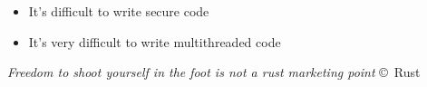 \begin{frame}{\insertsubsection}

  \begin{itemize}
  \item It's difficult to write secure code
  \item It's very difficult to write multithreaded code
  \end{itemize}

  \textit{Freedom to shoot yourself in the foot is not a rust marketing point}
  © Rust

\end{frame}
